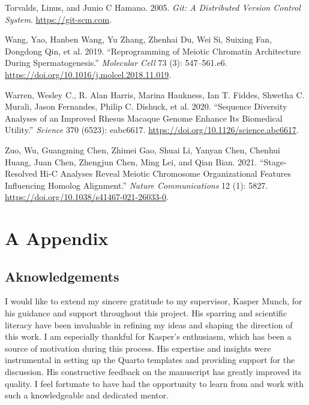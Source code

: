 \documentclass[
  11pt,
  a4paper,
]{scrbook}
\newlength{\cslhangindent}
\newenvironment{CSLReferences}[2] %
 {\begin{list}{}{%
  \setlength{\itemindent}{0pt}
  \setlength{\leftmargin}{0pt}
  \setlength{\parsep}{0pt}
  \ifodd #1
   \setlength{\leftmargin}{\cslhangindent}
   \setlength{\itemindent}{-1\cslhangindent}
  \fi
  \setlength{\itemsep}{#2\baselineskip}}}
 {\end{list}}
\let\oldemph\emph
\renewcommand\emph[1]{\oldemph{\color{gray}#1}}
\begin{document}
\begin{CSLReferences}{1}{0}
Torvalds, Linus, and Junio C Hamano. 2005. \emph{Git: A Distributed
Version Control System}. \url{https://git-scm.com}.

Wang, Yao, Hanben Wang, Yu Zhang, Zhenhai Du, Wei Si, Suixing Fan,
Dongdong Qin, et al. 2019. {``Reprogramming of {Meiotic Chromatin
Architecture} During {Spermatogenesis}.''} \emph{Molecular Cell} 73 (3):
547--561.e6. \url{https://doi.org/10.1016/j.molcel.2018.11.019}.

Warren, Wesley C., R. Alan Harris, Marina Haukness, Ian T. Fiddes,
Shwetha C. Murali, Jason Fernandes, Philip C. Dishuck, et al. 2020.
{``Sequence Diversity Analyses of an Improved Rhesus Macaque Genome
Enhance Its Biomedical Utility.''} \emph{Science} 370 (6523): eabc6617.
\url{https://doi.org/10.1126/science.abc6617}.

Zuo, Wu, Guangming Chen, Zhimei Gao, Shuai Li, Yanyan Chen, Chenhui
Huang, Juan Chen, Zhengjun Chen, Ming Lei, and Qian Bian. 2021.
{``Stage-Resolved {Hi-C} Analyses Reveal Meiotic Chromosome
Organizational Features Influencing Homolog Alignment.''} \emph{Nature
Communications} 12 (1): 5827.
\url{https://doi.org/10.1038/s41467-021-26033-0}.

\end{CSLReferences}

\chapter*{A Appendix}\label{a-appendix}

\section{Aknowledgements}\label{aknowledgements}

I would like to extend my sincere gratitude to my supervisor, Kasper
Munch, for his guidance and support throughout this project. His
sparring and scientific literacy have been invaluable in refining my
ideas and shaping the direction of this work. I am especially thankful
for Kasper's enthusiasm, which has been a source of motivation during
this process. His expertise and insights were instrumental in setting up
the Quarto templates and providing support for the discussion. His
constructive feedback on the manuscript has greatly improved its
quality. I feel fortunate to have had the opportunity to learn from and
work with such a knowledgeable and dedicated mentor.
\end{document}
